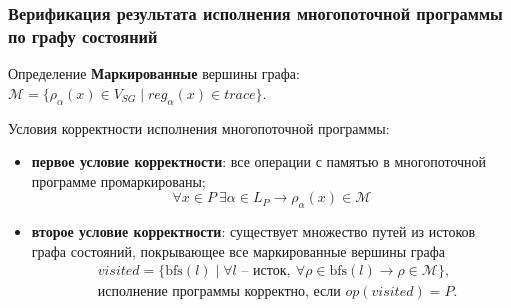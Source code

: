 \begin{frame}
  \frametitle{Верификация результата исполнения многопоточной
  программы по графу состояний}

  \begin{block}{Определение}
    \textbf{Маркированные} вершины графа: $\mathcal{M} =
    \{\rho_{\alpha}(x) \in V_{SG} \mid reg_{\alpha}(x) \in trace\}$.
  \end{block}

  Условия корректности исполнения многопоточной программы:
  \begin{itemize}
    \item \textbf{первое условие корректности}: все операции с
      памятью в многопоточной программе промаркированы;
      \begin{equation}
        \label{eq:verif-1st}
        \forall x \in P\ \exists \alpha \in L_P \rightarrow
        \rho_{\alpha}(x) \in \mathcal{M}
        \nonumber
      \end{equation}
    \item \textbf{второе условие корректности}: существует множество
      путей из истоков графа состояний,
      покрывающее все маркированные вершины графа
      \begin{align}
        \label{eq:verif-2nd}
        & visited = \{\text{bfs}(l) \mid \forall l \text{ --
          исток},\ \forall \rho \in \text{bfs}(l) \rightarrow \rho \in
        \mathcal{M}\}, \nonumber \\
        & \text{исполнение программы корректно, если } op(visited) = P.
        \nonumber
      \end{align}
  \end{itemize}

\end{frame}

